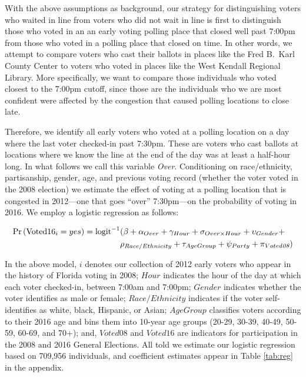 \documentclass[12pt,titlepage]{article}
\begin{document}
With the above assumptions as background, our strategy for
distinguishing voters who waited in line from voters who did not wait
in line is first to distinguish those who voted in an an early voting polling place
that closed well past 7:00pm from those who voted in a polling place
that closed on time.  In other words, we attempt to compare voters who
cast their ballots in places like the Fred B.\ Karl County Center to
voters who voted in places like the West Kendall Regional Library.
More specifically, we want to compare those individuals who voted
closest to the 7:00pm cutoff, since those are the individuals who we
are most confident were affected by the congestion that caused polling
locations to close late.
 
Therefore, we identify all early voters who voted at a polling
location on a day where the last voter checked-in past 7:30pm.  These
are voters who cast ballots at locations where we know the line at the
end of the day was at least a half-hour long.  In what follows we call
this variable \emph{Over}.  Conditioning on race/ethnicity, partisanship,
gender, age, and previous voting record (whether the voter voted in
the 2008 election) we estimate the effect of voting at a polling
location that is congested in 2012---one that goes ``over''
7:30pm---on the probability of voting in 2016.  We employ a logistic
regression as follows:

\begin{equation*}
  \begin{aligned}
    \textup{Pr}\left(\mathrm{Voted16}_{i} = yes\right) =  \textup{logit}^{-1}&(\beta + \alpha_{Over} + \gamma_{Hour} +
    \sigma_{Over \times Hour} + \upsilon_{Gender}  + \\& \rho_{Race/Ethnicity} +
      \tau_{Age Group} + \psi_{Party} + \pi_{Voted\emph{08}})
  \end{aligned}
\end{equation*}

In the above model, $i$ denotes our collection of 2012 early voters
who appear in the history of Florida voting in 2008; $Hour$ indicates
the hour of the day at which each voter checked-in, between 7:00am and
7:00pm; $Gender$ indicates whether the voter identifies as male or
female; $Race/Ethnicity$ indicates if the voter self-identifies as white, black,
Hispanic, or Asian; $AgeGroup$ classifies voters according to their
2016 age and bins them into 10-year age groups (20-29, 30-39, 40-49,
50-59, 60-69, and 70+); and, $Voted08$ and $Voted16$ are indicators
for participation in the 2008 and 2016 General Elections.  All told we
estimate our logistic regression based on 709,956 individuals, and
coefficient estimates appear in Table \ref{tab:reg} in the appendix.
\end{document}
